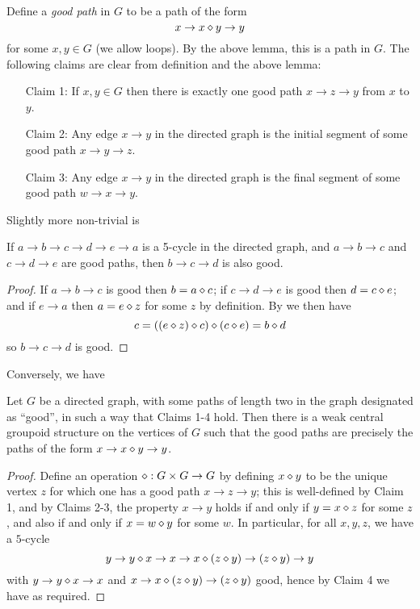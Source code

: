 Define a \emph{good path} in $G$ to be a path of the form $$x \to x \diamond y \to y$$ for some $x,y \in G$ (we allow loops). By the above lemma, this is a path in $G$. The following claims are clear from definition and the above lemma:
\begin{itemize}
  \item[Claim 1:] If $x,y \in G$ then there is exactly one good path $x \to z \to y$ from $x$ to $y$.
  \item[Claim 2:] Any edge $x \to y$ in the directed graph is the initial segment of some good path $x \to y \to z$.
  \item[Claim 3:] Any edge $x \to y$ in the directed graph is the final segment of some good path $w \to x \to y$.
\end{itemize}
Slightly more non-trivial is

\begin{lemma}[Claim 4]\label{claim-4}\leanok{}
  If $a \to b \to c \to d \to e \to a$ is a 5-cycle in the directed graph, and $a \to b \to c$ and $c \to d \to e$ are good paths, then $b \to c \to d$ is also good.
\end{lemma}

\begin{proof}
  If $a \to b \to c$ is good then $b = a \diamond c$; if $c \to d \to e$ is good then $d = c \diamond e$; and if $e \to a$ then $a = e \diamond z$ for some $z$ by definition. By  we then have
  $$ c = ((e \diamond z) \diamond c) \diamond (c \diamond e) = b \diamond d$$
  so $b \to c \to d$ is good.
\end{proof}

Conversely, we have

\begin{lemma}\label{rev-claim}\leanok{}
  Let $G$ be a directed graph, with some paths of length two in the graph designated as ``good'', in such a way that Claims 1-4 hold. Then there is a weak central groupoid structure on the vertices of $G$ such that the good paths are precisely the paths of the form $x \to x \diamond y \to y$.
\end{lemma}

\begin{proof}
  Define an operation $\diamond: G \times G \to G$ by defining $x \diamond y$ to be the unique vertex $z$ for which one has a good path $x \to z \to y$; this is well-defined by Claim 1, and by Claims 2-3, the property $x \to y$ holds if and only if $y = x \diamond z$ for some $z$, and also if and only if $x = w \diamond y$ for some $w$. In particular, for all $x,y,z$, we have a $5$-cycle
  $$ y \to y \diamond x \to x \to x \diamond (z \diamond y) \to (z \diamond y) \to y$$
  with $y \to y \diamond x \to x$ and $x \to x \diamond (z \diamond y) \to (z \diamond y)$ good, hence by Claim 4 we have  as required.
\end{proof}

